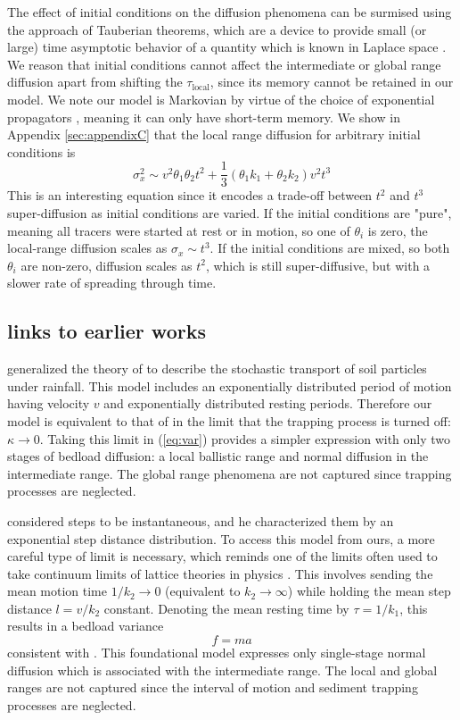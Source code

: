 \documentclass[]{agujournal2018}
\newcommand\be{\begin{equation}}
\newcommand\ee{\end{equation}}
\begin{document}
The effect of initial conditions on the diffusion phenomena can be surmised using the approach of Tauberian theorems, which are a device to provide small (or large) time asymptotic behavior of a quantity which is known in Laplace space \citep[e.g.][]{Weiss1994}.
We reason that initial conditions cannot affect the intermediate or global range diffusion apart from shifting the $\tau_\text{local}$, since its memory cannot be retained in our model.
We note our model is Markovian by virtue of the choice of exponential propagators \citep{Weiss1994}, meaning it can only have short-term memory.
We show in Appendix \ref{sec:appendixC} that the local range diffusion for arbitrary initial conditions is 
\be \sigma_x^2 \sim v^2 \theta_1 \theta_2 t^2  + \frac{1}{3}(\theta_1 k_1 + \theta_2 k_2)v^2t^3\ee
This is an interesting equation since it encodes a trade-off between $t^2$ and $t^3$ super-diffusion as initial conditions are varied.
If the initial conditions are "pure", meaning all tracers were started at rest or in motion, so one of $\theta_i$ is zero, the local-range diffusion scales as $\sigma_x \sim t^3.$
If the initial conditions are mixed, so both $\theta_i$ are non-zero, diffusion scales as $t^2$, which is still super-diffusive, but with a slower rate of spreading through time.

\subsection{links to earlier works}

\citet{Lisle1998} generalized the theory of \citet{Einstein1937} to describe the stochastic transport of soil particles under rainfall.
This model includes an exponentially distributed period of motion having velocity $v$ and exponentially distributed resting periods.
Therefore our model is equivalent to that of \citet{Lisle1998} in the limit that the trapping process is turned off: $\kappa \rightarrow 0$.
Taking this limit in (\ref{eq:var}) provides a simpler expression with only two stages of bedload diffusion: a local ballistic range and normal diffusion in the intermediate range. The global range phenomena are not captured since trapping processes are neglected.

\citet{Einstein1937} considered steps to be instantaneous, and he characterized them by an exponential step distance distribution.
To access this model from ours, a more careful type of limit is necessary, which reminds one of the limits often used to take continuum limits of lattice theories in physics \citep[e.g.][]{Goldstein1980, Weiss1994}.
This involves sending the mean motion time $1/k_2 \rightarrow 0 $ (equivalent to $k_2 \rightarrow \infty$) while holding the mean step distance $l = v/k_2$ constant.
Denoting the mean resting time by $\tau = 1/k_1$, this results in a bedload variance
\be f=ma \ee
consistent with \citet{Einstein1937}.
This foundational model expresses only single-stage normal diffusion which is associated with the intermediate range. 
The local and global ranges are not captured since the interval of motion and sediment trapping processes are neglected.
\end{document}
